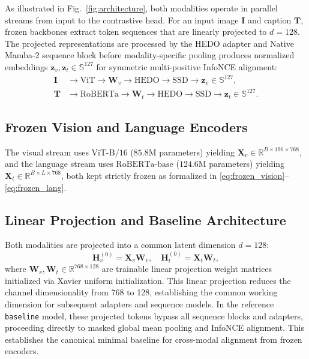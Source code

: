 \documentclass[conference]{IEEEtran}
\begin{document}
As illustrated in Fig.~\ref{fig:architecture}, both modalities operate in parallel streams from input to the contrastive head. For an input image $\mathbf{I}$ and caption $\mathbf{T}$, frozen backbones extract token sequences that are linearly projected to $d=128$. The projected representations are processed by the HEDO adapter and Native Mamba-2 sequence block before modality-specific pooling produces normalized embeddings $\mathbf{z}_v, \mathbf{z}_t \in \mathbb{S}^{127}$ for symmetric multi-positive InfoNCE alignment:
\begin{align}
\mathbf{I} &\to \mathrm{ViT} \to \mathbf{W}_v \to \mathrm{HEDO} \to \mathrm{SSD} \to \mathbf{z}_v \in \mathbb{S}^{127}, \\
\mathbf{T} &\to \mathrm{RoBERTa} \to \mathbf{W}_t \to \mathrm{HEDO} \to \mathrm{SSD} \to \mathbf{z}_t \in \mathbb{S}^{127}.
\end{align}

\subsection{Frozen Vision and Language Encoders}
The visual stream uses $\mathrm{ViT\text{-}B/16}$ ($85.8\text{M}$ parameters) yielding $\mathbf{X}_v \in \mathbb{R}^{B \times 196 \times 768}$, and the language stream uses $\mathrm{RoBERTa\text{-}base}$ ($124.6\text{M}$ parameters) yielding $\mathbf{X}_t \in \mathbb{R}^{B \times L \times 768}$, both kept strictly frozen as formalized in \eqref{eq:frozen_vision}--\eqref{eq:frozen_lang}.

\subsection{Linear Projection and Baseline Architecture}
Both modalities are projected into a common latent dimension $d=128$:
\begin{equation}
\label{eq:projection}
\mathbf{H}_v^{(0)} = \mathbf{X}_v \mathbf{W}_v, \quad \mathbf{H}_t^{(0)} = \mathbf{X}_t \mathbf{W}_t,
\end{equation}
where $\mathbf{W}_v, \mathbf{W}_t \in \mathbb{R}^{768 \times 128}$ are trainable linear projection weight matrices initialized via Xavier uniform initialization. This linear projection reduces the channel dimensionality from 768 to 128, establishing the common working dimension for subsequent adapters and sequence models. In the reference \texttt{baseline} model, these projected tokens bypass all sequence blocks and adapters, proceeding directly to masked global mean pooling and InfoNCE alignment. This establishes the canonical minimal baseline for cross-modal alignment from frozen encoders.
\end{document}
